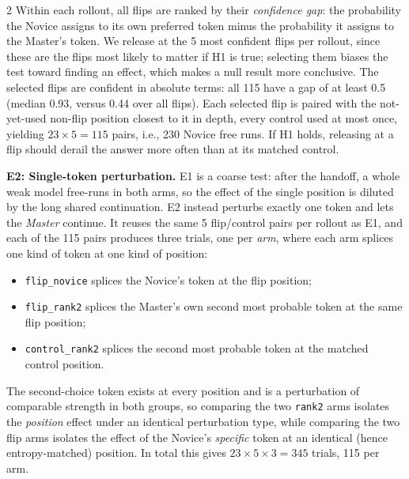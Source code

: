 \documentclass[9pt]{article}
\begin{document}
\begin{multicols}{2}
Within each rollout, all flips are ranked by their \emph{confidence gap}: the
probability the Novice assigns to its own preferred token minus the
probability it assigns to the Master's token. We release at the 5 most
confident flips per rollout, since these are the flips most likely to matter
if H1 is true; selecting them biases the test toward finding an effect, which
makes a null result more conclusive. The selected flips are confident in
absolute terms: all 115 have a gap of at least 0.5 (median 0.93, versus 0.44
over all flips). Each selected flip is paired with the not-yet-used non-flip
position closest to it in depth, every control used at most once, yielding
$23 \times 5 = 115$ pairs, i.e., 230 Novice free runs. If H1 holds, releasing
at a flip should derail the answer more often than at its matched control.

\textbf{E2: Single-token perturbation.} E1 is a coarse test: after the
handoff, a whole weak model free-runs in both arms, so the effect of the
single position is diluted by the long shared continuation. E2 instead
perturbs exactly one token and lets the \emph{Master} continue. It reuses the
same 5 flip/control pairs per rollout as E1, and each of the 115 pairs
produces three trials, one per \emph{arm}, where each arm splices one kind of
token at one kind of position:
\begin{itemize}\setlength\itemsep{1pt}
  \item \texttt{flip\_novice} splices the Novice's token at the flip
        position;
  \item \texttt{flip\_rank2} splices the Master's own second most probable
        token at the same flip position;
  \item \texttt{control\_rank2} splices the second most probable token at
        the matched control position.
\end{itemize}
The second-choice token exists at every position and is a perturbation of
comparable strength in both groups, so comparing the two \texttt{rank2} arms
isolates the \emph{position} effect under an identical perturbation type,
while comparing the two flip arms isolates the effect of the Novice's
\emph{specific} token at an identical (hence entropy-matched) position. In
total this gives $23 \times 5 \times 3 = 345$ trials, 115 per arm.


\end{multicols}
\end{document}
